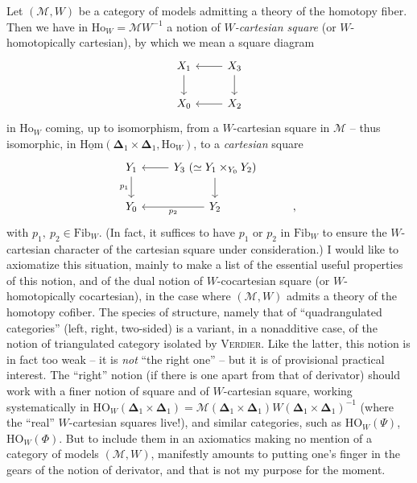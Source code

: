 \documentclass[11pt]{article}
\newcommand{\msp}[1]{\marginpar{\footnotesize [#1]}}
\begin{document}
Let $(\mathcal{M},W)$ be a category of models admitting a theory of the homotopy fiber. Then we have in $\mathrm{Ho}_W=\mathcal{M}W^{-1}$ a notion of \textit{$W$-cartesian square} (or $W$-homotopically cartesian), by which we mean a square diagram
\[
\begin{tikzcd}
X_1 \arrow[d] & X_3 \arrow[l] \arrow[d] \\
X_0 & X_2 \arrow[l]
\end{tikzcd}
\]
in $\mathrm{Ho}_W$ coming, up to isomorphism, from a $W$-cartesian square in $\mathcal{M}$ – thus isomorphic, in $\underline{\mathrm{Hom}}(\boldsymbol{\Delta}_1\times\boldsymbol{\Delta}_1,\mathrm{Ho}_W)$, to a \textit{cartesian} square %
\[
\begin{tikzcd}
Y_1 \arrow[d, "p_1"'] & Y_3\ (\simeq Y_1\times_{Y_0}Y_2) \arrow[l] \arrow[d] & \\
Y_0 & Y_2 \arrow[l, "p_2"] & ,
\end{tikzcd}
\]
with $p_1,\ p_2\in\mathrm{Fib}_W$. (In fact, it suffices to have $p_1$ or $p_2$ in $\mathrm{Fib}_W$ to ensure the $W$-cartesian character of the cartesian square under consideration.) I would like to axiomatize this situation, mainly to make a list of the essential useful properties of this notion, and of the dual notion of $W$-cocartesian square (or $W$-homotopically cocartesian), in the case where $(\mathcal{M},W)$ admits a theory of the homotopy cofiber. The species of structure, namely that of ``quadrangulated categories'' (left, right, two-sided) is a variant, in a \msp{page 2} nonadditive case, of the notion of triangulated category isolated by \textsc{Verdier}. Like the latter, this notion is in fact too weak – it is \textit{not} ``the right one'' – but it is of provisional practical interest. The ``right'' notion (if there is one apart from that of derivator) should work with a finer notion of square and of $W$-cartesian square, working systematically in $\mathrm{HO}_W(\boldsymbol{\Delta}_1\times\boldsymbol{\Delta}_1)=\mathcal{M}(\boldsymbol{\Delta}_1\times\boldsymbol{\Delta}_1)W(\boldsymbol{\Delta}_1\times\boldsymbol{\Delta}_1)^{-1}$ (where the ``real'' $W$-cartesian squares live!), and similar categories, such as $\mathrm{HO}_W(\Psi)$, $\mathrm{HO}_W(\Phi)$. But to include them in an axiomatics making no mention of a category of models $(\mathcal{M},W)$, manifestly amounts to putting one's finger in the gears of the notion of derivator, and that is not my purpose for the moment.
\end{document}
